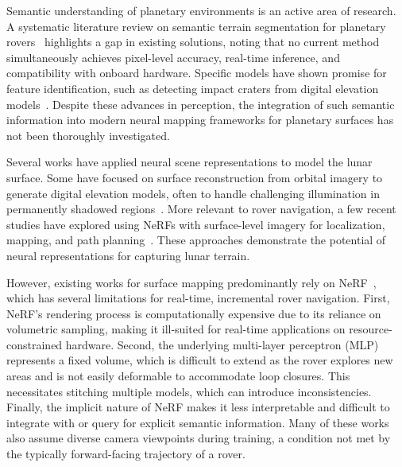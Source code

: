 Semantic understanding of planetary environments is an active area of research. A systematic literature review on semantic terrain segmentation for planetary rovers~\cite{kuang_semantic_2022} highlights a gap in existing solutions, noting that no current method simultaneously achieves pixel-level accuracy, real-time inference, and compatibility with onboard hardware. Specific models have shown promise for feature identification, such as detecting impact craters from digital elevation models~\cite{jia_moon_2021}. Despite these advances in perception, the integration of such semantic information into modern neural mapping frameworks for planetary surfaces has not been thoroughly investigated.

Several works have applied neural scene representations to model the lunar surface. Some have focused on surface reconstruction from orbital imagery to generate digital elevation models, often to handle challenging illumination in permanently shadowed regions~\cite{van_kints_neural_2025, adams_summary_2023}. More relevant to rover navigation, a few recent studies have explored using NeRFs with surface-level imagery for localization, mapping, and path planning~\cite{huang_monocular_2025, hansen_analyzing_2024, dai_neural_2023, zhang_neural_2024}. These approaches demonstrate the potential of neural representations for capturing lunar terrain.

However, existing works for surface mapping predominantly rely on NeRF~\cite{mildenhall_nerf_2021}, which has several limitations for real-time, incremental rover navigation. First, NeRF's rendering process is computationally expensive due to its reliance on volumetric sampling, making it ill-suited for real-time applications on resource-constrained hardware. Second, the underlying multi-layer perceptron (MLP) represents a fixed volume, which is difficult to extend as the rover explores new areas and is not easily deformable to accommodate loop closures. This necessitates stitching multiple models, which can introduce inconsistencies. Finally, the implicit nature of NeRF makes it less interpretable and difficult to integrate with or query for explicit semantic information. Many of these works also assume diverse camera viewpoints during training, a condition not met by the typically forward-facing trajectory of a rover.

